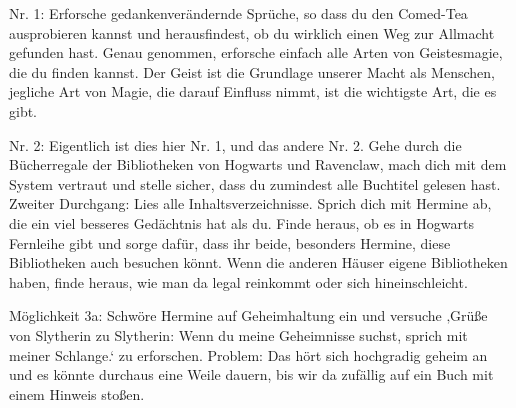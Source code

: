\begin{em}
Nr. 1: Erforsche gedankenverändernde Sprüche, so dass du den Comed-Tea ausprobieren kannst und herausfindest, ob du wirklich einen Weg zur Allmacht gefunden hast. Genau genommen, erforsche einfach alle Arten von Geistesmagie, die du finden kannst. Der Geist ist die Grundlage unserer Macht als Menschen, jegliche Art von Magie, die darauf Einfluss nimmt, ist die wichtigste Art, die es gibt.

Nr. 2: Eigentlich ist dies hier Nr. 1, und das andere Nr. 2. Gehe durch die Bücherregale der Bibliotheken von Hogwarts und Ravenclaw, mach dich mit dem System vertraut und stelle sicher, dass du zumindest alle Buchtitel gelesen hast. Zweiter Durchgang: Lies alle Inhaltsverzeichnisse. Sprich dich mit Hermine ab, die ein viel besseres Gedächtnis hat als du. Finde heraus, ob es in Hogwarts Fernleihe gibt und sorge dafür, dass ihr beide, besonders Hermine, diese Bibliotheken auch besuchen könnt. Wenn die anderen Häuser eigene Bibliotheken haben, finde heraus, wie man da legal reinkommt oder sich hineinschleicht.

Möglichkeit 3a: Schwöre Hermine auf Geheimhaltung ein und versuche ‚Grüße von Slytherin zu Slytherin: Wenn du meine Geheimnisse suchst, sprich mit meiner Schlange.‘ zu erforschen. Problem: Das hört sich hochgradig geheim an und es könnte durchaus eine Weile dauern, bis wir da zufällig auf ein Buch mit einem Hinweis stoßen.


\end{em}
